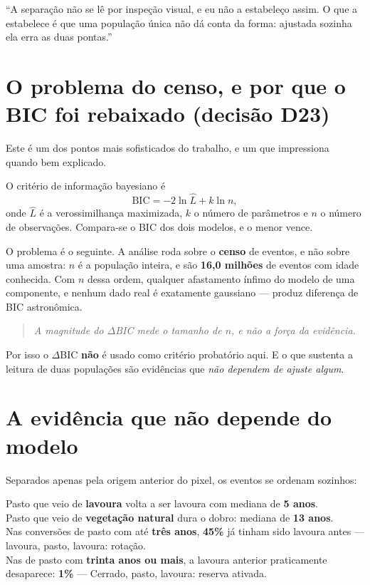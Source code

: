 \begin{nabanca}
``A separação não se lê por inspeção visual, e eu não a estabeleço assim. O que
a estabelece é que uma população única não dá conta da forma: ajustada sozinha
ela erra as duas pontas.''
\end{nabanca}

\section{O problema do censo, e por que o BIC foi rebaixado (decisão D23)}

Este é um dos pontos mais sofisticados do trabalho, e um que impressiona quando
bem explicado.

O critério de informação bayesiano é
\begin{equation}
\mathrm{BIC} = -2 \ln \hat{L} + k \ln n,
\end{equation}
onde $\hat{L}$ é a verossimilhança maximizada, $k$ o número de parâmetros e $n$
o número de observações. Compara-se o BIC dos dois modelos, e o menor vence.

O problema é o seguinte. A análise roda sobre o \textbf{censo} de eventos, e não
sobre uma amostra: $n$ é a população inteira, e são \textbf{16,0 milhões} de
eventos com idade conhecida. Com $n$ dessa ordem, qualquer afastamento ínfimo do
modelo de uma componente, e nenhum dado real é exatamente gaussiano ---
produz diferença de BIC astronômica.

\begin{quote}\itshape\color{cortinta}
A magnitude do $\Delta$BIC mede o tamanho de $n$, e não a força da evidência.
\end{quote}

Por isso o $\Delta$BIC \textbf{não} é usado como critério probatório aqui. E o
que sustenta a leitura de duas populações são evidências que \emph{não dependem
de ajuste algum}.

\section{A evidência que não depende do modelo}

Separados apenas pela origem anterior do pixel, os eventos se ordenam sozinhos:

\begin{ancora}
Pasto que veio de \textbf{lavoura} volta a ser lavoura com mediana de
\textbf{5 anos}. \\
Pasto que veio de \textbf{vegetação natural} dura o dobro: mediana de
\textbf{13 anos}. \\[4pt]
Nas conversões de pasto com até \textbf{três anos}, \textbf{45\%} já tinham sido
lavoura antes --- lavoura, pasto, lavoura: rotação. \\
Nas de pasto com \textbf{trinta anos ou mais}, a lavoura anterior praticamente
desaparece: \textbf{1\%} --- Cerrado, pasto, lavoura: reserva ativada.
\end{ancora}

